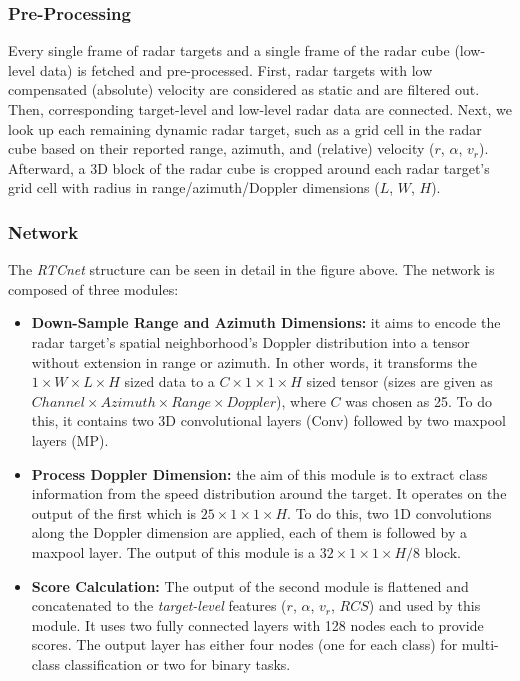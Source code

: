 \subsubsection{Pre-Processing}\label{header-n366}

Every single frame of radar targets and a single frame of the radar cube
(low-level data) is fetched and pre-processed. First, radar targets with
low compensated (absolute) velocity are considered as static and are
filtered out. Then, corresponding target-level and low-level radar data
are connected. Next, we look up each remaining dynamic radar target,
such as a grid cell in the radar cube based on their reported range,
azimuth, and (relative) velocity ($r$, $\alpha$, $v_r$).
Afterward, a 3D block of the radar cube is cropped around each radar
target's grid cell with radius in range/azimuth/Doppler dimensions
($L$, $W$, $H$).

\subsubsection{Network}\label{header-n368}

The \emph{RTCnet} structure can be seen in detail in the figure above.
The network is composed of three modules:

\begin{itemize}
\item
  \textbf{Down-Sample Range and Azimuth Dimensions:} it aims to encode
  the radar target's spatial neighborhood's Doppler distribution into a
  tensor without extension in range or azimuth. In other words, it
  transforms the $1 \times W \times L \times H$ sized data to a $C \times 1 \times 1
  \times H$ sized tensor (sizes are given as $Channel \times Azimuth \times Range \times
  Doppler$), where $C$ was chosen as 25. To do this, it contains two 3D
  convolutional layers (Conv) followed by two maxpool layers (MP).
\item
  \textbf{Process Doppler Dimension:} the aim of this module is to
  extract class information from the speed distribution around the
  target. It operates on the output of the first which is $25 \times 1 \times 1 \times
  H$. To do this, two 1D convolutions along the Doppler dimension are
  applied, each of them is followed by a maxpool layer. The output of
  this module is a $32 \times 1 \times 1 \times H/8$ block.
\item
  \textbf{Score Calculation:} The output of the second module is
  flattened and concatenated to the \emph{target-level} features ($r$,
  $\alpha$, $v_r$, $RCS$) and used by this module. It uses two
  fully connected layers with 128 nodes each to provide scores. The
  output layer has either four nodes (one for each class) for
  multi-class classification or two for binary tasks.
\end{itemize}

